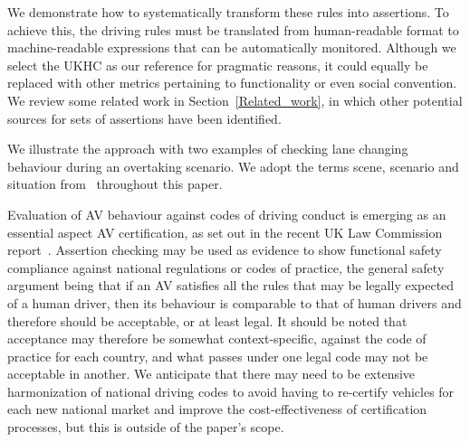 %
We demonstrate how to systematically transform these rules into assertions. To achieve this, the driving rules must be translated from human-readable format to machine-readable expressions that can be automatically monitored. %
Although we select the UKHC as %
our reference 
for pragmatic reasons, it could equally be replaced with other metrics pertaining to functionality or even social convention. We review some related work in Section~\ref{Related_work}, in which other potential sources for %
sets of assertions 
have been identified.
%
%

%
We illustrate the approach
with two examples of %
checking lane changing behaviour
during an overtaking scenario. We adopt the terms scene, scenario and situation from~\cite{Ulbrich2015} throughout this paper. 
%


Evaluation of AV behaviour against codes of driving conduct is emerging as an essential aspect AV %
certification, as set out in the recent UK Law Commission report~\cite{law_commission_UK}. 
%
Assertion %
checking may be used as evidence to show functional safety compliance against national regulations or codes of practice, the general safety argument being that if an AV satisfies all the rules that may be legally expected of a human driver, then its behaviour is comparable to that of human drivers and therefore should be acceptable, or at least legal. It should be noted that acceptance may therefore be somewhat context-specific, against the code of practice for each country, and what passes under one legal code may not be acceptable in another. 
% 
We anticipate that there may need to be extensive harmonization of national driving codes to avoid having to re-certify vehicles for each new national market and improve the cost-effectiveness of certification processes, but this is outside of the paper's scope.

